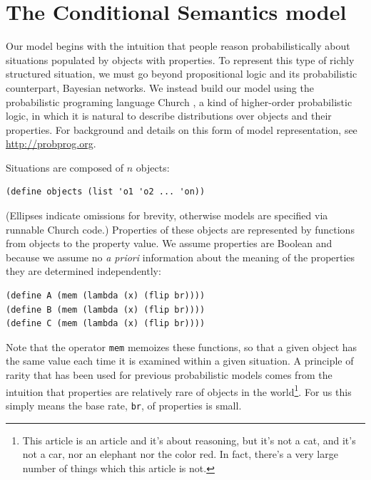 \documentclass[10pt,letterpaper]{article}
\begin{document}
%
%

\section{The Conditional Semantics model}

Our model begins with the intuition that people reason probabilistically about situations populated by objects with properties. To represent this type of richly structured situation, we must go beyond propositional logic and its probabilistic counterpart, Bayesian networks. We instead build our model using the probabilistic programing language Church \cite{Goodman2008}, a kind of higher-order probabilistic logic, in which it is natural to describe distributions over objects and their properties. For background and details on this form of model representation, see \url{http://probprog.org}.

Situations are composed of $n$ objects:
\begin{lstlisting}
(define objects (list 'o1 'o2 ... 'on))
\end{lstlisting}
(Ellipses indicate omissions for brevity, otherwise models are specified via runnable Church code.)
Properties of these objects are represented by functions from objects to the property value. We assume properties are Boolean and because we assume no \emph{a priori} information about the meaning of the properties they are determined independently:
\begin{lstlisting}
(define A (mem (lambda (x) (flip br))))
(define B (mem (lambda (x) (flip br))))
(define C (mem (lambda (x) (flip br))))
\end{lstlisting}
Note that the operator \lstinline{mem} memoizes these functions, so that a given object has the same value each time it is examined within a given situation. 
A principle of rarity that has been used for previous probabilistic models \cite{OCwasson} comes from the intuition that properties are relatively rare of objects in the world\footnote{This article is an article and it's about reasoning, but it's not a cat, and it's not a car, nor an elephant nor the color red. In fact, there's a very large number of things which this article is not.}. For us this simply means the base rate, \lstinline{br}, of properties is small.  
\end{document}
